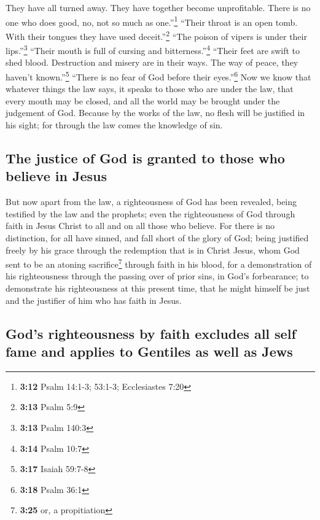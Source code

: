  They have all turned away. They have together become
unprofitable. There is no one who does good, no, not so much as
one.''\footnote{\textbf{3:12} Psalm 14:1-3; 53:1-3; Ecclesiastes 7:20}
 ``Their throat is an open tomb. With their tongues they
have used deceit.''\footnote{\textbf{3:13} Psalm 5:9} ``The poison of
vipers is under their lips.''\footnote{\textbf{3:13} Psalm 140:3}
 ``Their mouth is full of cursing and
bitterness.''\footnote{\textbf{3:14} Psalm 10:7}  ``Their
feet are swift to shed blood.  Destruction and misery are
in their ways.  The way of peace, they haven't
known.''\footnote{\textbf{3:17} Isaiah 59:7-8}  ``There
is no fear of God before their eyes.''\footnote{\textbf{3:18} Psalm 36:1}
 Now we know that whatever things the law says, it speaks
to those who are under the law, that every mouth may be closed, and all
the world may be brought under the judgement of God. 
Because by the works of the law, no flesh will be justified in his
sight; for through the law comes the knowledge of sin.

\hypertarget{the-justice-of-god-is-granted-to-those-who-believe-in-jesus}{%
\subsection{The justice of God is granted to those who believe in
Jesus}\label{the-justice-of-god-is-granted-to-those-who-believe-in-jesus}}

 But now apart from the law, a righteousness of God has
been revealed, being testified by the law and the prophets;
 even the righteousness of God through faith in Jesus
Christ to all and on all those who believe. For there is no distinction,
 for all have sinned, and fall short of the glory of God;
 being justified freely by his grace through the
redemption that is in Christ Jesus,  whom God sent to be
an atoning sacrifice\footnote{\textbf{3:25} or, a propitiation} through
faith in his blood, for a demonstration of his righteousness through the
passing over of prior sins, in God's forbearance;  to
demonstrate his righteousness at this present time, that he might
himself be just and the justifier of him who has faith in Jesus.

\hypertarget{gods-righteousness-by-faith-excludes-all-self-fame-and-applies-to-gentiles-as-well-as-jews}{%
\subsection{God's righteousness by faith excludes all self fame and
applies to Gentiles as well as
Jews}\label{gods-righteousness-by-faith-excludes-all-self-fame-and-applies-to-gentiles-as-well-as-jews}}

